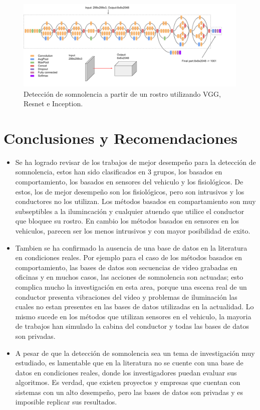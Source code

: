 \documentclass{article}
\begin{document}
	
	
	\begin{figure}[H]
		\centering
		\includegraphics[width=\textwidth]{img/inception}		
		\caption{Detección de somnolencia a partir de un rostro utilizando VGG, Resnet e Inception.}
		\label{fig:inception}
	\end{figure}
	
	
	\section{Conclusiones y Recomendaciones}
	\begin{itemize}
		\item Se ha logrado revisar de los trabajos de mejor desempeño para la detección de somnolencia, estos han sido clasificados en 3 grupos, los basados en comportamiento, los basados en sensores del vehiculo y los fisiológicos. De estos, los de mejor desempeño son los fisiológicos, pero son intrusivos y los conductores no los utilizan. Los métodos basados en compartamiento son muy subseptibles a la ilumincación y cualquier atuendo que utilice el conductor que bloquee su rostro. En cambio los métodos basados en sensores en los vehiculos, parecen ser los menos intrusivos y con mayor posibilidad de exito.
		\item Tambien se ha confirmado la ausencia de una base de datos en la literatura en condiciones reales. Por ejemplo para el caso de los métodos basados en comportamiento, las bases de datos son secuencias de video grabadas en oficinas y en muchos casos, las acciones de somnolencia son actuadas; esto complica mucho la investigación en esta area, porque una escena real de un conductor presenta vibraciones del video y problemas de iluminación las cuales no estan presentes en las bases de datos utilizadas en la actualidad. Lo mismo sucede en los métodos que utilizan sensores en el vehiculo, la mayoria de trabajos han simulado la cabina del conductor y todas las  bases de datos son privadas.
		\item A pesar de que la detección de somnolencia sea un tema de investigación muy estudiado, es lamentable que en la literatura no se cuente con una base de datos en condiciones reales, donde los investigadores puedan evaluar sus algoritmos. Es verdad, que existen proyectos y empresas que cuentan con sistemas con un alto desempeño, pero las bases de datos son privadas y es imposible replicar sus resultados.		
	\end{itemize}
\end{document}
